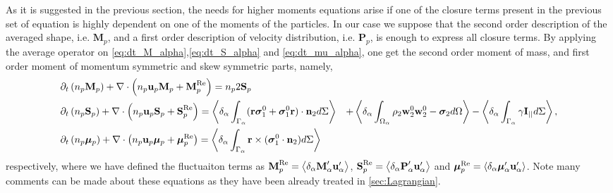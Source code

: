 As it is suggested in the previous section, the needs for higher moments equations arise if one of the closure terms present in the previous set of equation is highly dependent on one of the moments of the particles. 
In our case we suppose that the second order description of the averaged shape, i.e. $\textbf{M}_p$, and a first order description of velocity distribution, i.e. $\textbf{P}_p$,  is enough to express all closure terms. 
By applying the average operator on \ref{eq:dt_M_alpha},\ref{eq:dt_S_alpha} and \ref{eq:dt_mu_alpha}, one get the second order moment of mass, and first order moment of momentum symmetric and skew symmetric parts, namely, 
\begin{align}
    &\partial_t \left(n_p \textbf{M}_p\right)
    + \mathbf{\nabla}\cdot \left(
        n_p \textbf{u}_p \textbf{M}_p
    + \textbf{M}_p^\text{Re}
    \right)
    =
    n_p2  \textbf{S}_p
    \label{eq:dt_hybrid_Mp}
    \\
\label{eq:dt_hybrid_Sp}
&\partial_t \left(n_p \textbf{S}_p\right)
+ \mathbf{\nabla}\cdot \left(
    n_p \textbf{u}_p \textbf{S}_p
+ \textbf{S}_p^\text{Re}
\right)
=
\left<\delta_\alpha \int_{\Gamma_\alpha} (\textbf{r}\bm\sigma_1^0+\bm\sigma_1^0\textbf{r})\cdot \textbf{n}_2 d\Sigma\right>
&+ \left<\delta_\alpha \int_{\Omega_\alpha} 
    \rho_2 \textbf{w}_2^0  \textbf{w}_2^0 
    - \bm{\sigma}_2
 d\Omega\right>
-  \left<\delta_\alpha \int_{\Gamma_\alpha} \gamma \textbf{I}_{||} d\Sigma\right>,
\\
\label{eq:dt_hybrid_mup}
&\partial_t \left(n_p \bm{\mu}_p\right)
+ \mathbf{\nabla}\cdot \left(
n_p \textbf{u}_p \bm{\mu}_p
+ \bm{\mu}_p^\text{Re}
\right)
=
\left<\delta_\alpha \int_{\Gamma_\alpha} \textbf{r}\times(\bm\sigma_1^0\cdot \textbf{n}_2) d\Sigma\right>
\end{align}
respectively, where we have defined the fluctuaiton terms as $
 \textbf{M}_p^\text{Re}
 = \left<\delta_\alpha \textbf{M}_\alpha' \textbf{u}_\alpha'\right> $,  $ 
 \textbf{S}_p^\text{Re}
 = \left<\delta_\alpha \textbf{P}_\alpha' \textbf{u}_\alpha'\right>$ and $ 
 \bm{\mu}_p^\text{Re}
 = \left<\delta_\alpha \bm{\mu}_\alpha' \textbf{u}_\alpha'\right>
$.
Note many comments can be made about these equations as they have been already treated in \ref{sec:Lagrangian}. 
